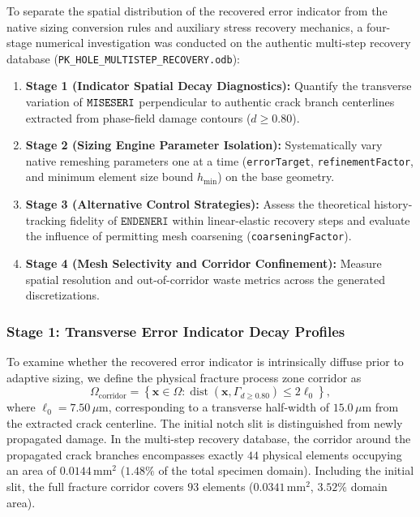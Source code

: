 To separate the spatial distribution of the recovered error indicator from the native sizing conversion rules and auxiliary stress recovery mechanics, a four-stage numerical investigation was conducted on the authentic multi-step recovery database (\texttt{PK\_HOLE\_MULTISTEP\_RECOVERY.odb}):
\begin{enumerate}
  \item \textbf{Stage 1 (Indicator Spatial Decay Diagnostics):} Quantify the transverse variation of $\texttt{MISESERI}$ perpendicular to authentic crack branch centerlines extracted from phase-field damage contours ($d \ge 0.80$).
  \item \textbf{Stage 2 (Sizing Engine Parameter Isolation):} Systematically vary native remeshing parameters one at a time (\texttt{errorTarget}, \texttt{refinementFactor}, and minimum element size bound $h_{\min}$) on the base geometry.
  \item \textbf{Stage 3 (Alternative Control Strategies):} Assess the theoretical history-tracking fidelity of $\texttt{ENDENERI}$ within linear-elastic recovery steps and evaluate the influence of permitting mesh coarsening (\texttt{coarseningFactor}).
  \item \textbf{Stage 4 (Mesh Selectivity and Corridor Confinement):} Measure spatial resolution and out-of-corridor waste metrics across the generated discretizations.
\end{enumerate}

\subsubsection{Stage 1: Transverse Error Indicator Decay Profiles}
To examine whether the recovered error indicator is intrinsically diffuse prior to adaptive sizing, we define the physical fracture process zone corridor as
\begin{equation}
  \Omega_{\mathrm{corridor}} = \left\{ \mathbf{x} \in \Omega : \operatorname{dist}(\mathbf{x}, \Gamma_{d \ge 0.80}) \le 2\ell_0 \right\},
  \label{eq:crack_corridor_definition}
\end{equation}
where $\ell_0 = 7.50\,\mu\mathrm{m}$, corresponding to a transverse half-width of $15.0\,\mu\mathrm{m}$ from the extracted crack centerline. The initial notch slit is distinguished from newly propagated damage. In the multi-step recovery database, the corridor around the propagated crack branches encompasses exactly $44$ physical elements occupying an area of $0.0144\,\mathrm{mm}^2$ ($1.48\%$ of the total specimen domain). Including the initial slit, the full fracture corridor covers $93$ elements ($0.0341\,\mathrm{mm}^2$, $3.52\%$ domain area).

